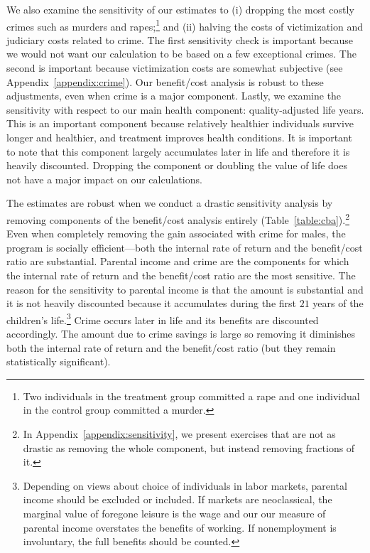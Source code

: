 We also examine the sensitivity of our estimates to (i) dropping the most costly crimes such as murders and rapes;\footnote{Two individuals in the treatment group committed a rape and one individual in the control group committed a murder.} and (ii) halving the costs of victimization and judiciary costs related to crime. The first sensitivity check is important because we would not want our calculation to be based on a few exceptional crimes. The second is important because victimization costs are somewhat subjective (see Appendix~\ref{appendix:crime}). Our benefit/cost analysis is robust to these adjustments, even when crime is a major component. Lastly, we examine the sensitivity with respect to our main health component: quality-adjusted life years. This is an important component because relatively healthier individuals survive longer and healthier, and treatment improves health conditions. It is important to note that this component largely accumulates later in life and therefore it is heavily discounted. Dropping the component or doubling the value of life does not have a major impact on our calculations.

The estimates are robust when we conduct a drastic sensitivity analysis by removing components of the benefit/cost analysis entirely (Table~\ref{table:cba}).\footnote{In Appendix~\ref{appendix:sensitivity}, we present exercises that are not as drastic as removing the whole component, but instead removing fractions of it.} Even when completely removing the gain associated with crime for males, the program is socially efficient---both the internal rate of return and the benefit/cost ratio are substantial. Parental income and crime are the components for which the internal rate of return and the benefit/cost ratio are the most sensitive. The reason for the sensitivity to parental income is that the amount is substantial and it is not heavily discounted because it accumulates during the first $21$ years of the children's life.\footnote{Depending on views about choice of individuals in labor markets, parental income should be excluded or included. If markets are neoclassical, the marginal value of foregone leisure is the wage and our our measure of parental income overstates the benefits of working. If nonemployment is involuntary, the full benefits should be counted.} Crime occurs later in life and its benefits are discounted accordingly. The amount due to crime savings is large so removing it diminishes both the internal rate of return and the benefit/cost ratio (but they remain statistically significant).

